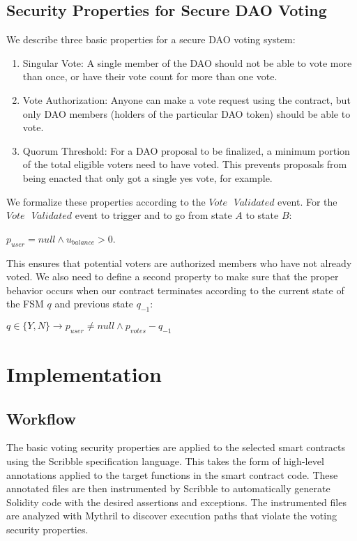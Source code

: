 \documentclass[conference]{IEEEtran}
\begin{document}
\subsection{Security Properties for Secure DAO Voting}
We describe three basic properties for a secure DAO voting system:
\begin{enumerate}
    \item Singular Vote: A single member of the DAO should not be able to vote more than once, or have their vote count for more than one vote.
    \item Vote Authorization: Anyone can make a vote request using the contract, but only DAO members (holders of the particular DAO token) should be able to vote.
    \item Quorum Threshold: For a DAO proposal to be finalized, a minimum portion of the total eligible voters need to have voted. This prevents proposals from being enacted that only got a single yes vote, for example.
\end{enumerate}

We formalize these properties according to the $Vote\mbox{ }Validated$ event.
For the $Vote\mbox{ }Validated$ event to trigger and to go from state $A$ to state $B$:
\begin{center}
$p_{user} = null \land u_{balance} > 0$. 
\end{center}
This ensures that potential voters are authorized members who have not already voted. We also need to define a second property to make sure that the proper behavior occurs when our contract terminates according to the current state of the FSM $q$ and previous state $q_{-1}$:
\begin{center}
    $q \in\{Y,N\}\xrightarrow{}p_{user} \neq null \land p_{votes} - q_{-1}$
\end{center}


\section{Implementation}
\subsection{Workflow}
The basic voting security properties are applied to the selected smart contracts using the Scribble specification language. This takes the form of high-level annotations applied to the target functions in the smart contract code. These annotated files are then instrumented by Scribble to automatically generate Solidity code with the desired assertions and exceptions. The instrumented files are analyzed with Mythril to discover execution paths that violate the voting security properties.
\end{document}
